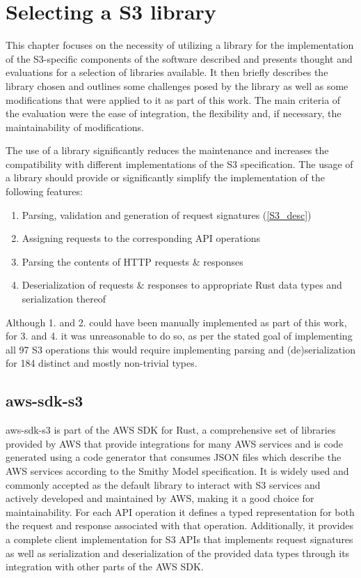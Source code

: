 \chapter{Selecting a S3 library}

This chapter focuses on the necessity of utilizing a library for the implementation of the S3-specific components of the software described and presents thought and evaluations for a selection of libraries available. It then briefly describes the library chosen and outlines some challenges posed by the library as well as some modifications that were applied to it as part of this work. The main criteria of the evaluation were the ease of integration, the flexibility and, if necessary, the maintainability of modifications.

The use of a library significantly reduces the maintenance and increases the compatibility with different implementations of the S3 specification. The usage of a library should provide or significantly simplify the implementation of the following features:
\begin{enumerate}
	\item Parsing, validation and generation of request signatures (\ref{S3_desc})
	\item Assigning requests to the corresponding API operations
	\item Parsing the contents of HTTP requests \& responses
	\item \label{types_deser} Deserialization of requests \& responses to appropriate Rust data types and serialization thereof
\end{enumerate}

Although 1. and 2. could have been manually implemented as part of this work, for 3. and 4. it was unreasonable to do so, as per the stated goal of implementing all 97 S3 operations this would require implementing parsing and (de)serialization for 184 distinct and mostly non-trivial types.

\section{aws-sdk-s3}

aws-sdk-s3 is part of the AWS SDK for Rust, a comprehensive set of libraries provided by AWS that provide integrations for many AWS services and is code generated using a code generator that consumes JSON files which describe the AWS services according to the Smithy Model specification\cite{AWS_SDK_GITHUB}. It is widely used and commonly accepted as the default library to interact with S3 services\cite{} and actively developed and maintained by AWS, making it a good choice for maintainability. For each API operation it defines a typed representation for both the request and response associated with that operation. Additionally, it provides a complete client implementation for S3 APIs that implements request signatures as well as serialization and deserialization of the provided data types through its integration with other parts of the AWS SDK. 


